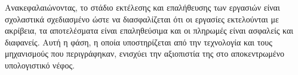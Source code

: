 Ανακεφαλαιώνοντας, το στάδιο εκτέλεσης και επαλήθευσης των εργασιών είναι σχολαστικά σχεδιασμένο ώστε να διασφαλίζεται ότι οι εργασίες εκτελούνται με ακρίβεια, τα αποτελέσματα είναι επαληθεύσιμα και οι πληρωμές είναι ασφαλείς και διαφανείς. Αυτή η φάση, η οποία υποστηρίζεται από την τεχνολογία  και τους μηχανισμούς που περιγράφηκαν, ενισχύει την αξιοπιστία της  στο αποκεντρωμένο υπολογιστικό νέφος.
